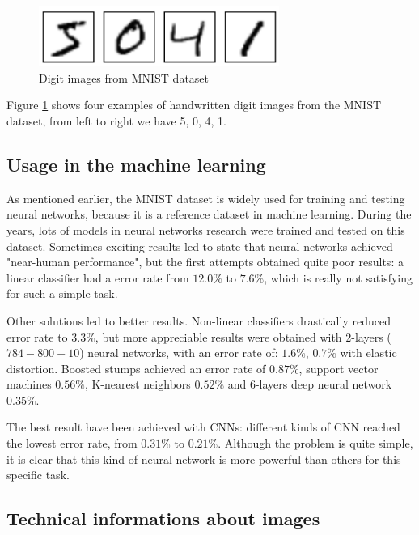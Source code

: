 \begin{figure}
	\centering
	\includegraphics[width=0.7\textwidth]{Images/MNIST_images}
	\caption{Digit images from \acs{MNIST} dataset}
	\label{fig:MNIST_images}
\end{figure}

Figure \ref{fig:MNIST_images} shows four examples of handwritten digit images from the \acs{MNIST} dataset, from left to right we have 5, 0, 4, 1.

\subsection{Usage in the machine learning}

As mentioned earlier, the \acs{MNIST} dataset is widely used for training and testing neural networks, because it is a reference dataset in machine learning. During the years, lots of models in neural networks research were trained and tested on this dataset. Sometimes exciting results led to state that neural networks achieved "near-human performance", but the first attempts obtained quite poor results: a linear classifier had a error rate from $12.0 \%$ to $7.6 \%$, which is really not satisfying for such a simple task.

Other solutions led to better results. Non-linear classifiers drastically reduced error rate to $3.3 \%$, but more appreciable results were obtained with 2-layers ($784-800-10$) neural networks, with an error rate of: $1.6 \%$, $0.7 \%$ with elastic distortion. Boosted stumps achieved an error rate of $0.87 \%$, support vector machines $0.56 \%$, K-nearest neighbors $0.52 \%$ and 6-layers deep neural network $0.35 \%$.

The best result have been achieved with \acsp{CNN}: different kinds of \acs{CNN} reached the lowest error rate, from $0.31 \%$ to $0.21 \%$. Although the problem is quite simple, it is clear that this kind of neural network is more powerful than others for this specific task.

\subsection{Technical informations about images}

